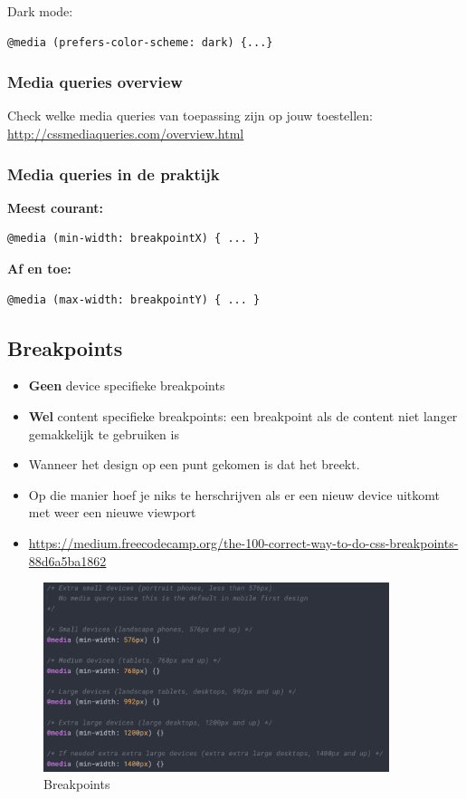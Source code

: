 \documentclass{article}
\newcommand{\bold}[1]{\textbf{#1}}
\begin{document}
Dark mode:

\begin{lstlisting}
@media (prefers-color-scheme: dark) {...}
\end{lstlisting}

\subsubsection{Media queries overview}
Check welke media queries van toepassing zijn op jouw toestellen:\\
\url{http://cssmediaqueries.com/overview.html}

\subsubsection{Media queries in de praktijk}
\bold{Meest courant:}
\begin{lstlisting}
@media (min-width: breakpointX) { ... }
\end{lstlisting}
\bold{Af en toe:}
\begin{lstlisting}
@media (max-width: breakpointY) { ... }
\end{lstlisting}

\subsection{Breakpoints}
\begin{itemize}
    \item \bold{Geen} device specifieke breakpoints
    \item \bold{Wel} content specifieke breakpoints: een breakpoint als de content niet langer gemakkelijk te gebruiken is
    \item Wanneer het design op een punt gekomen is dat het breekt.
    \item Op die manier hoef je niks te herschrijven als er een nieuw device uitkomt met weer een nieuwe viewport
    \item \url{https://medium.freecodecamp.org/the-100-correct-way-to-do-css-breakpoints-88d6a5ba1862}
\end{itemize}

\begin{figure}[H]
    \centering
    \includegraphics[width=0.9\textwidth]{img/breakpoints.png}
    \caption{Breakpoints}
\end{figure}
\end{document}
